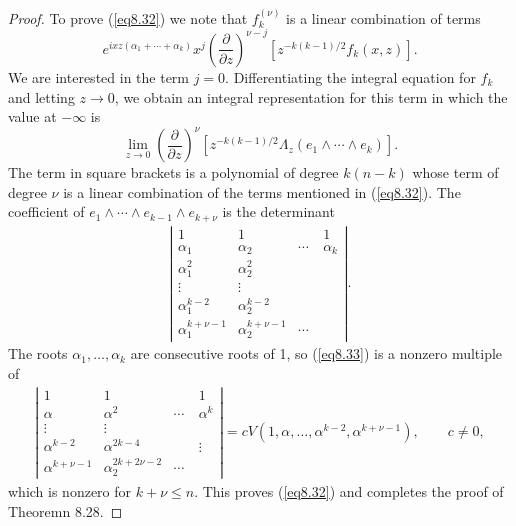 \documentclass{surv-l}
\theoremstyle{plain}
\theoremstyle{definition}
\numberwithin{equation}{chapter}
\begin{document}
\begin{proof}
To prove (\ref{eq8.32}) we note that $f_{k}^{(\nu)}$ is a linear combination of terms
\begin{equation*}
e^{ixz(\alpha_{1}+\cdots +\alpha_{k})}{x^{j}}\left(\frac{\partial}{\partial z}\right)^{\nu-j}[z^{-k(k-1)/2}f_{k}(x, z)].
\end{equation*}
We are interested in the term $j=0$. Differentiating the integral equation for $f_{k}$ and letting $z\rightarrow 0$, we obtain an integral representation for this term in which the value at $-\infty$ is
\begin{equation*}
\lim_{z\rightarrow 0}\left(\frac{\partial}{\partial z}\right)^{\nu}[z^{-k(k-1)/2}\Lambda_{z}(e_{1}\wedge\cdots\wedge e_{k})].
\end{equation*}
The term in square brackets is a polynomial of degree $k(n-k)$ whose term of degree $\nu$ is a linear combination of the terms mentioned in (\ref{eq8.32}). The coefficient
of $e_{1}\wedge\cdots\wedge e_{k-1}\wedge e_{k+\nu}$ is the determinant
\begin{align}\label{eq8.33}
\left|\begin{array}{cccc}
        1 & 1 & \quad & 1 \\
        \alpha_{1} & \alpha_{2} & \cdots & \alpha_{k} \\
        \alpha_{1}^{2}& \alpha_{2}^{2} & \quad & \quad \\
        \vdots & \vdots & \quad & \quad \\
        \alpha_{1}^{k-2} & \alpha_{2}^{k-2} & \quad & \quad\\
        \alpha_{1}^{k+\nu-1} & \alpha_{2}^{k+\nu-1} & \cdots & \quad\end{array}\right|.
      \end{align}
The roots $\alpha_{1},\ldots, \alpha_{k}$ are consecutive roots of 1, so (\ref{eq8.33}) is a nonzero multiple of
\begin{align*}
\left|\begin{array}{cccc}
      1 & 1 & \quad & 1 \\
      \alpha & \alpha^{2} & \cdots & \alpha^{k}\\
      \vdots & \vdots & \quad & \quad\\
      \alpha^{k-2} & \alpha^{2k-4} & \quad & \vdots\\
      \alpha^{k+\nu-1} & \alpha_{2}^{2k+2\nu-2} & \cdots & \quad
    \end{array}\right|= cV(1,\alpha,\ldots,\alpha^{k-2},\alpha^{k+\nu-1}),\qquad c\neq 0,
    \end{align*}
    which is nonzero for $k+\nu\leq n$. This proves (\ref{eq8.32}) and completes the proof of Theoremn 8.28.


\end{proof}
\end{document}
